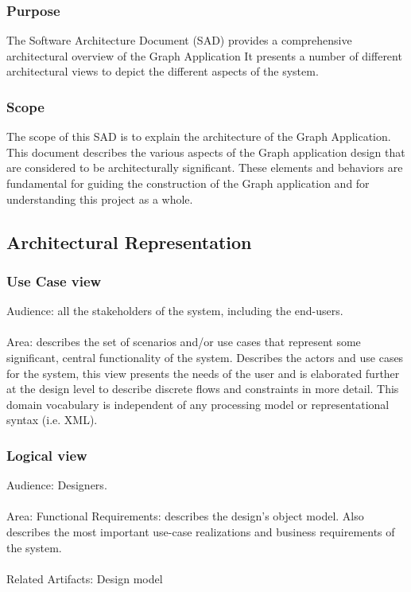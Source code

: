 \documentclass[a4paper,10pt]{article}
\begin{document}
\subsubsection{Purpose}
The Software Architecture Document (SAD) provides a comprehensive architectural overview of the Graph Application It presents a number of different architectural views to depict the different aspects of the system.  
\subsubsection{Scope}
The scope of this SAD is to explain the architecture of the Graph Application.
This document describes the various aspects of the Graph application design that are considered to be architecturally significant. These elements and behaviors are fundamental for guiding the construction of the Graph application and for understanding this project as a whole.

\subsection{Architectural Representation}
\subsubsection{Use Case view}
Audience: all the stakeholders of the system, including the end-users.
\paragraph{}
Area: describes the set of scenarios and/or use cases that represent some significant, central functionality of the system. Describes the actors and use cases for the system, this view presents the needs of the user and is elaborated further at the design level to describe discrete flows and constraints in more detail. This domain vocabulary is independent of any processing model or representational syntax (i.e. XML).
\subsubsection{Logical view}
Audience: Designers.
\paragraph{}
Area: Functional Requirements: describes the design's object model. Also describes the most important use-case realizations and business requirements of the system.
\paragraph{}
Related Artifacts: Design model
\end{document}
